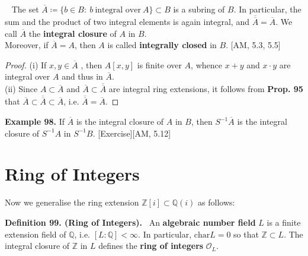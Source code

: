 \documentclass[12pt,a4paper,footinclude=true,headinclude=true]{scrbook} %
\newenvironment{proposition}[2][]
{\renewcommand\theinnercustomprop{#2}\innercustomprop[#1] 
\begin{mdframed}[backgroundcolor=gray!20]\ }
{\end{mdframed}\endinnercustomprop}
\newenvironment{definition}[2][Definition]
    { \begin{mdframed}[backgroundcolor=gray!20] \textbf{#1 #2.}\ }
    {  \end{mdframed}}
\newenvironment{example}[2][Example]
    { \begin{mdframed}[backgroundcolor=gray!20] \textbf{#1 #2.} }
    {  \end{mdframed}}
\begin{document}
\begin{proposition}{97. (Integral Closure)}
    The set $\overline{A}\coloneqq\{ b\in B:\ b\ \text{integral over}\ A\} \subset B$ is a subring of $B$. In particular, the sum and the product of two integral elements is again integral, and $\overline{\overline{A}}=\overline{A}$. We call $\overline{A}$ the \textbf{integral closure} of $A$ in $B$.\\
    Moreover, if $\overline{A}=A$, then $A$ is called \textbf{integrally closed} in $B$. [AM, 5.3, 5.5]
\end{proposition}
\begin{proof}
    (i) If $x,y\in\overline{A}$ , then $A[x,y]$ is finite over $A$, whence $x+y$ and $x\cdot y$ are integral over $A$ and thus in $\overline{A}$. \\
    (ii) Since $A\subset\overline{A}$ and $\overline{A}\subset \overline{\overline{A}}$ are integral ring extensions, it follows from \textbf{Prop. 95} that $\overline{A}\subset \overline{\overline{A}}\subset \overline{A}$, i.e. $\overline{\overline{A}}=\overline{A}$.
\end{proof}

\begin{example}{98}
    If $\overline{A}$ is the integral closure of $A$ in $B$, then $S^{-1}\overline{A}$ is the integral closure of $S^{-1}A$ in $S^{-1}B$. [Exercise][AM, 5.12]
\end{example}

\newpage

\section{Ring of Integers}

Now we generalise the ring extension $\mathbb{Z}[i]\subset\mathbb{Q}(i)$ as follows:

\begin{definition}{99. (Ring of Integers)}
    An \textbf{algebraic number field} $L$ is a finite extension field of $\mathbb{Q}$, i.e. $[L:\mathbb{Q}]<\infty$. In particular, $\mathrm{char}L=0$ so that $\mathbb{Z}\subset L$. The integral closure of $\mathbb{Z}$ in $L$ defines the \textbf{ring of integers} $\mathcal{O}_L$.
\end{definition}
\end{document}

